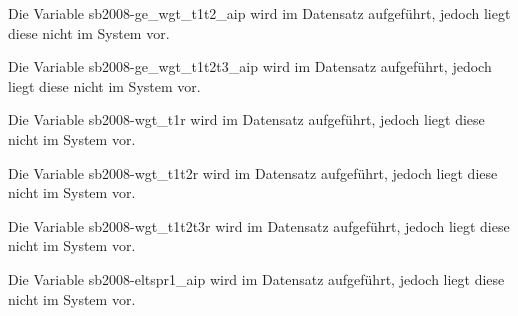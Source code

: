 \documentclass[a4paper]{article}
\begin{document}
		Die Variable sb2008-ge\_wgt\_t1t2\_aip wird im Datensatz aufgeführt, jedoch liegt diese nicht im System vor.

		Die Variable sb2008-ge\_wgt\_t1t2t3\_aip wird im Datensatz aufgeführt, jedoch liegt diese nicht im System vor.

				

				

				

				

				

				

		Die Variable sb2008-wgt\_t1r wird im Datensatz aufgeführt, jedoch liegt diese nicht im System vor.

				

				

		Die Variable sb2008-wgt\_t1t2r wird im Datensatz aufgeführt, jedoch liegt diese nicht im System vor.

				

				

		Die Variable sb2008-wgt\_t1t2t3r wird im Datensatz aufgeführt, jedoch liegt diese nicht im System vor.

				

				

				

				

				

				

				

				

				

				

				

				

				

				

		Die Variable sb2008-eltspr1\_aip wird im Datensatz aufgeführt, jedoch liegt diese nicht im System vor.
\end{document}
